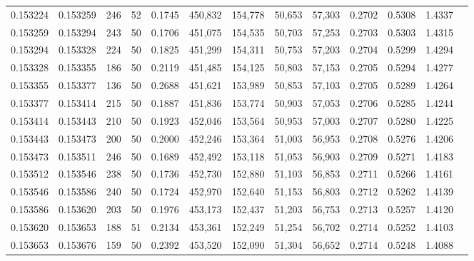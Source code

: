 \begin{tabular}{rrrrrrrrrrrrr}
0.153224 & 0.153259 &   246 &  52 &                                     0.1745 & 450,832 & 154,778 &  50,653 &  57,303 & 0.2702 & 0.5308 & 1.4337 \\
0.153259 & 0.153294 &   243 &  50 &                                     0.1706 & 451,075 & 154,535 &  50,703 &  57,253 & 0.2703 & 0.5303 & 1.4315 \\
0.153294 & 0.153328 &   224 &  50 &                                     0.1825 & 451,299 & 154,311 &  50,753 &  57,203 & 0.2704 & 0.5299 & 1.4294 \\
0.153328 & 0.153355 &   186 &  50 &                                     0.2119 & 451,485 & 154,125 &  50,803 &  57,153 & 0.2705 & 0.5294 & 1.4277 \\
0.153355 & 0.153377 &   136 &  50 &                                     0.2688 & 451,621 & 153,989 &  50,853 &  57,103 & 0.2705 & 0.5289 & 1.4264 \\
0.153377 & 0.153414 &   215 &  50 &                                     0.1887 & 451,836 & 153,774 &  50,903 &  57,053 & 0.2706 & 0.5285 & 1.4244 \\
0.153414 & 0.153443 &   210 &  50 &                                     0.1923 & 452,046 & 153,564 &  50,953 &  57,003 & 0.2707 & 0.5280 & 1.4225 \\
0.153443 & 0.153473 &   200 &  50 &                                     0.2000 & 452,246 & 153,364 &  51,003 &  56,953 & 0.2708 & 0.5276 & 1.4206 \\
0.153473 & 0.153511 &   246 &  50 &                                     0.1689 & 452,492 & 153,118 &  51,053 &  56,903 & 0.2709 & 0.5271 & 1.4183 \\
0.153512 & 0.153546 &   238 &  50 &                                     0.1736 & 452,730 & 152,880 &  51,103 &  56,853 & 0.2711 & 0.5266 & 1.4161 \\
0.153546 & 0.153586 &   240 &  50 &                                     0.1724 & 452,970 & 152,640 &  51,153 &  56,803 & 0.2712 & 0.5262 & 1.4139 \\
0.153586 & 0.153620 &   203 &  50 &                                     0.1976 & 453,173 & 152,437 &  51,203 &  56,753 & 0.2713 & 0.5257 & 1.4120 \\
0.153620 & 0.153653 &   188 &  51 &                                     0.2134 & 453,361 & 152,249 &  51,254 &  56,702 & 0.2714 & 0.5252 & 1.4103 \\
0.153653 & 0.153676 &   159 &  50 &                                     0.2392 & 453,520 & 152,090 &  51,304 &  56,652 & 0.2714 & 0.5248 & 1.4088 \\

\end{tabular}
